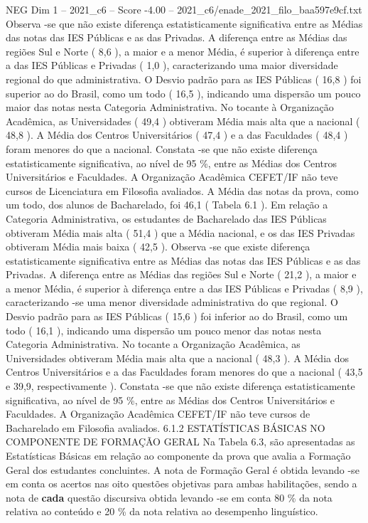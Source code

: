 \begin{textsample}{NEG Dim 1 – 2021\_c6 – Score -4.00 – 2021\_c6/enade\_2021\_filo\_baa597e9cf.txt}
Observa -se que não existe diferença estatisticamente significativa entre as Médias das notas das IES Públicas e as das Privadas.
A diferença entre as Médias das regiões Sul e Norte ( 8,6 ), a maior e a menor Média, é superior à diferença entre a das IES Públicas e Privadas ( 1,0 ), caracterizando uma maior diversidade regional do que administrativa.
O Desvio padrão para as IES Públicas ( 16,8 ) foi superior ao do Brasil, como um todo ( 16,5 ), indicando uma dispersão um pouco maior das notas nesta Categoria Administrativa.
No tocante à Organização Acadêmica, as Universidades ( 49,4 ) obtiveram Média mais alta que a nacional ( 48,8 ).
A Média dos Centros Universitários ( 47,4 ) e a das Faculdades ( 48,4 ) foram menores do que a nacional.
Constata -se que não existe diferença estatisticamente significativa, ao nível de 95 \%, entre as Médias dos Centros Universitários e Faculdades.
A Organização Acadêmica CEFET/IF não teve cursos de Licenciatura em Filosofia avaliados.
A Média das notas da prova, como um todo, dos alunos de Bacharelado, foi 46,1 ( Tabela 6.1 ).
Em relação a Categoria Administrativa, os estudantes de Bacharelado das IES Públicas obtiveram Média mais alta ( 51,4 ) que a Média nacional, e os das IES Privadas obtiveram Média mais baixa ( 42,5 ).
Observa -se que existe diferença estatisticamente significativa entre as Médias das notas das IES Públicas e as das Privadas.
A diferença entre as Médias das regiões Sul e Norte ( 21,2 ), a maior e a menor Média, é superior à diferença entre a das IES Públicas e Privadas ( 8,9 ), caracterizando -se uma menor diversidade administrativa do que regional.
O Desvio padrão para as IES Públicas ( 15,6 ) foi inferior ao do Brasil, como um todo ( 16,1 ), indicando uma dispersão um pouco menor das notas nesta Categoria Administrativa.
No tocante a Organização Acadêmica, as Universidades obtiveram Média mais alta que a nacional ( 48,3 ).
A Média dos Centros Universitários e a das Faculdades foram menores do que a nacional ( 43,5 e 39,9, respectivamente ).
Constata -se que não existe diferença estatisticamente significativa, ao nível de 95 \%, entre as Médias dos Centros Universitários e Faculdades.
A Organização Acadêmica CEFET/IF não teve cursos de Bacharelado em Filosofia avaliados. 6.1.2 ESTATÍSTICAS BÁSICAS NO COMPONENTE DE FORMAÇÃO GERAL Na Tabela 6.3, são apresentadas as Estatísticas Básicas em relação ao componente da prova que avalia a Formação Geral dos estudantes concluintes.
A nota de Formação Geral é obtida levando -se em conta os acertos nas oito questões objetivas para ambas habilitações, sendo a nota de \textbf{cada} questão discursiva obtida levando -se em conta 80 \% da nota relativa ao conteúdo e 20 \% da nota relativa ao desempenho linguístico.

\end{textsample}
